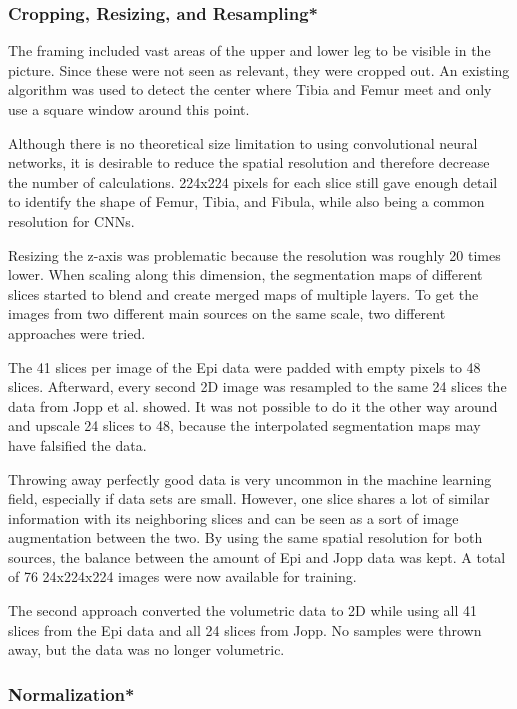 \subsubsection{Cropping, Resizing, and Resampling*}

The framing included vast areas of the upper and lower leg to be visible in the picture. Since these were not seen as relevant, they were cropped out. An existing algorithm was used to detect the center where Tibia and Femur meet and only use a square window around this point.

Although there is no theoretical size limitation to using convolutional neural networks, it is desirable to reduce the spatial resolution and therefore decrease the number of calculations. 224x224 pixels for each slice still gave enough detail to identify the shape of Femur, Tibia, and Fibula, while also being a common resolution for CNNs.

Resizing the z-axis was problematic because the resolution was roughly 20 times lower. When scaling along this dimension, the segmentation maps of different slices started to blend and create merged maps of multiple layers. To get the images from two different main sources on the same scale, two different approaches were tried.

The 41 slices per image of the Epi data were padded with empty pixels to 48 slices. Afterward, every second 2D image was resampled to the same 24 slices the data from Jopp et al. showed. It was not possible to do it the other way around and upscale 24 slices to 48, because the interpolated segmentation maps may have falsified the data.

Throwing away perfectly good data is very uncommon in the machine learning field, especially if data sets are small. However, one slice shares a lot of similar information with its neighboring slices and can be seen as a sort of image augmentation between the two. By using the same spatial resolution for both sources, the balance between the amount of Epi and Jopp data was kept. A total of 76 24x224x224 images were now available for training.

The second approach converted the volumetric data to 2D while using all 41 slices from the Epi data and all 24 slices from Jopp. No samples were thrown away, but the data was no longer volumetric. 

\subsubsection{Normalization*}

